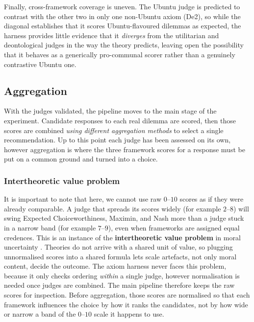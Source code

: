 \documentclass[10pt,twocolumn,a4paper]{article}
\begin{document}
Finally, cross-framework coverage is uneven. The Ubuntu judge is predicted to
contrast with the other two in only one non-Ubuntu axiom (De2), so while the
diagonal establishes that it scores Ubuntu-flavoured dilemmas as expected, the
harness provides little evidence that it \emph{diverges} from the utilitarian and
deontological judges in the way the theory predicts, leaving open the possibility
that it behaves as a generically pro-communal scorer rather than a genuinely
contrastive Ubuntu one.

\subsection{Aggregation}
\label{sec:aggregation}

With the judges validated, the pipeline moves to the main stage of the
experiment. Candidate responses to each real dilemma are scored, then those
scores are combined \textit{using different aggregation methods} to select a
single recommendation. Up to this point each judge has been assessed on its
own, however aggregation is where the three framework scores for a response
must be put on a common ground and turned into a choice.

\subsubsection{Intertheoretic value problem}
\label{sec:intertheoretic}

It is important to note that here, we cannot use raw $0$--$10$ scores as if
they were already comparable. A judge that spreads its scores widely (for
example $2$--$8$) will swing Expected Choiceworthiness, Maximin, and Nash more
than a judge stuck in a narrow band (for example $7$--$9$), even when
frameworks are assigned equal credences. This is an instance of the
\textbf{intertheoretic value problem} in moral uncertainty
\cite{macaskill2020}. Theories do not arrive with a shared unit of value, so
plugging unnormalised scores into a shared formula lets scale artefacts, not
only moral content, decide the outcome. The axiom harness never faces this
problem, because it only checks ordering \emph{within} a single judge, however
normalisation is needed once judges are combined. The main pipeline therefore
keeps the raw scores for inspection. Before aggregation, those scores are
normalised so that each framework influences the choice by how it ranks the
candidates, not by how wide or narrow a band of the $0$--$10$ scale it happens
to use.
\end{document}
